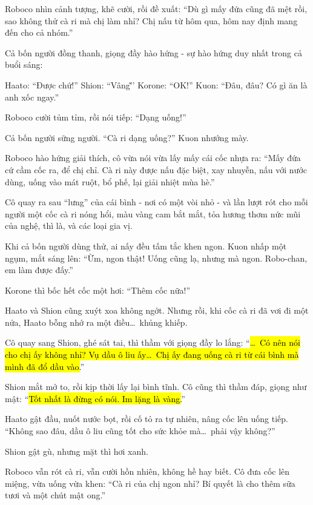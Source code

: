 \documentclass[../main.tex]{subfiles}
\begin{document}
Roboco nhìn cảnh tượng, khẽ cười, rồi đề xuất: ``Dù gì mấy đứa cũng đã mệt rồi, sao không thử cà ri mà chị làm nhỉ? Chị nấu từ hôm qua, hôm nay định mang đến cho cả nhóm.''

Cả bốn người đồng thanh, giọng đầy hào hứng - sự hào hứng duy nhất trong cả buổi sáng:

Haato: ``Được chứ!''
Shion: ``Vâng\~''
Korone: ``OK!''
Kuon: ``Đâu, đâu? Có gì ăn là anh xốc ngay.''

Roboco cười tủm tỉm, rồi nói tiếp: ``Dạng uống!''

Cả bốn người sững người. ``Cà ri dạng uống?''  Kuon nhướng mày.

Roboco hào hứng giải thích, cô vừa nói vừa lấy mấy cái cốc nhựa ra: ``Mấy đứa cứ cầm cốc ra, để chị chỉ. Cà ri này được nấu đặc biệt, xay nhuyễn, nấu với nước dùng, uống vào mát ruột, bổ phế, lại giải nhiệt mùa hè.''

Cô quay ra sau ``lưng'' của cái bình - nơi có một vòi nhỏ - và lần lượt rót cho mỗi người một cốc cà ri nóng hổi, màu vàng cam bắt mắt, tỏa hương thơm nức mũi của nghệ, thì là, và các loại gia vị.


Khi cả bốn người dùng thử, ai nấy đều tấm tắc khen ngon. Kuon nhấp một ngụm, mắt sáng lên: ``Ừm, ngon thật! Uống cũng lạ, nhưng mà ngon. Robo-chan, em làm được đấy.''

Korone thì bốc hết cốc một hơi: ``Thêm cốc nữa!''

Haato và Shion cũng xuýt xoa không ngớt. Nhưng rồi, khi cốc cà ri đã vơi đi một nửa, Haato bỗng nhớ ra một điều\dots\ khủng khiếp.

Cô quay sang Shion, ghé sát tai, thì thầm với giọng đầy lo lắng: ``\hl{\dots\ Có nên nói cho chị ấy không nhỉ? Vụ dầu ô liu ấy\dots\ Chị ấy đang uống cà ri từ cái bình mà mình đã đổ dầu vào.}''

Shion mắt mở to, rồi kịp thời lấy lại bình tĩnh. Cô cũng thì thầm đáp, giọng như mật: ``\hl{Tốt nhất là đừng có nói. Im lặng là vàng.}''

Haato gật đầu, nuốt nước bọt, rồi cố tỏ ra tự nhiên, nâng cốc lên uống tiếp. ``Không sao đâu, dầu ô liu cũng tốt cho sức khỏe mà\dots\ phải vậy không?''

Shion gật gù, nhưng mặt thì hơi xanh.

Roboco vẫn rót cà ri, vẫn cười hồn nhiên, không hề hay biết. Cô đưa cốc lên miệng, vừa uống vừa khen: ``Cà ri của chị ngon nhỉ? Bí quyết là cho thêm sữa tươi và một chút mật ong.''
\end{document}
